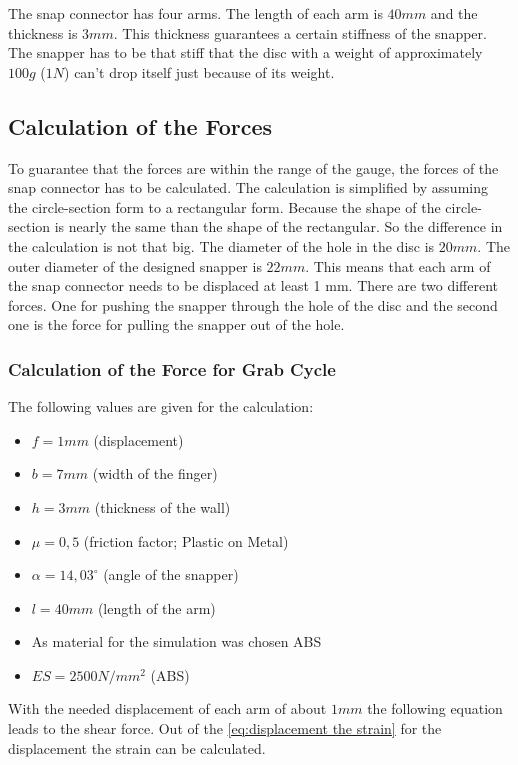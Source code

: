 \documentclass[a4paper,12pt]{scrreprt}
\begin{document}
The snap connector has four arms. The length of each arm is $40mm$ and the thickness is $3mm$. This thickness guarantees a certain stiffness of the snapper. The snapper has to be that stiff that the disc with a weight of approximately $100g$ ($1N$) can't drop itself just because of its weight.

\subsection{Calculation of the Forces}
To guarantee that the forces are within the range of the gauge, the forces of the snap connector has to be calculated. The calculation is simplified by assuming the circle-section form to a rectangular form. Because the shape of the circle-section is nearly the same than the shape of the rectangular. So the difference in the calculation is not that big. The diameter of the hole in the disc is $20mm$. The outer diameter of the designed snapper is $22mm$. This means that each arm of the snap connector needs to be displaced at least 1 mm. There are two different forces. One for pushing the snapper through the hole of the disc and the second one is the force for pulling the snapper out of the hole.

\subsubsection{Calculation of the Force for Grab Cycle}

The following values are given for the calculation:
\begin{itemize}
\item $f = 1 mm$ (displacement)
\item $b = 7 mm$ (width of the finger)
\item $h = 3 mm$ (thickness of the wall)
\item $\mu = 0,5$ (friction factor; Plastic on Metal)
\item $\alpha = 14,03^{\circ}$ (angle of the snapper)
\item $l = 40 mm$ (length of the arm)
\item As material for the simulation was chosen  ABS
\item $ES = 2500 N/mm^{2}$ (ABS)
\end{itemize}
With the needed displacement of each arm of about $1mm$ the following equation leads to the shear force. Out of the \autoref{eq:displacement the strain} for the displacement the strain can be calculated.
\end{document}
